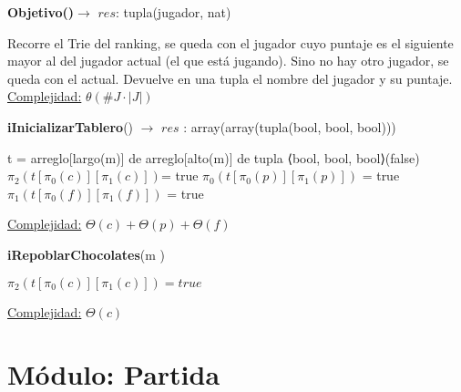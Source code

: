 \documentclass[10pt,a4paper]{article}
\begin{document}
\begin{Algoritmos}
    \begin{algorithm}[H]{\textbf{Objetivo()}}$\to$ $res$: tupla(jugador, nat)
        \begin{algorithmic}
            \State Recorre el Trie del ranking, se queda con el jugador cuyo puntaje es el siguiente mayor al del jugador actual (el que está jugando). Sino no hay otro jugador, se queda con el actual.
            Devuelve en una tupla el nombre del jugador y su puntaje.
            \State \underline{Complejidad:} $\theta(\#J \cdot |J|)$
        \end{algorithmic}
    \end{algorithm}

    \begin{algorithm}[H]{\textbf{iInicializarTablero}() $\to$ $res$ : array(array(tupla(bool, bool, bool)))}
        \begin{algorithmic}
        
            \State t = arreglo[largo(m)] de arreglo[alto(m)] de tupla ⟨bool, bool, bool⟩(false)
		     
			    \State $\pi_2(t[\pi_0(c)][\pi_1(c)])$= true
		    \EndFor
		     
			    \State $\pi_0(t[\pi_0(p)][\pi_1(p)])$ = true
	        \EndFor
		     
			    \State $\pi_1(t[\pi_0(f)][\pi_1(f)])$ = true
		    \EndFor
            
        
            \Statex \underline{Complejidad:} $\Theta(c) + \Theta(p) + \Theta(f)$
        \end{algorithmic}
    \end{algorithm}

    \begin{algorithm}[H]{\textbf{iRepoblarChocolates}(m )}
        \begin{algorithmic}
                \State $\pi_2(t[\pi_0(c)][\pi_1(c)]) = true$
            \EndFor
            
        
            \Statex \underline{Complejidad:} $\Theta(c)$
        \end{algorithmic}
    \end{algorithm}
    
\end{Algoritmos}

\section{Módulo: Partida}
\end{document}
